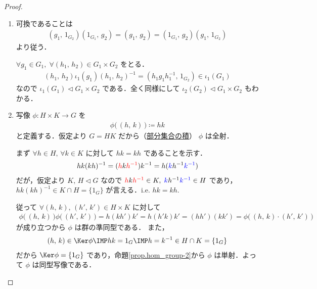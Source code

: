 \documentclass[geometry_main]{subfiles}
\begin{document}
\begin{proof}
	\begin{enumerate}
		\item 
		可換であることは
		\begin{align}
			(g_1,\, 1_{G_2})(1_{G_1},\, g_2) = (g_1,\, g_2) = (1_{G_1},\, g_2)(g_1,\, 1_{G_2})
		\end{align}
		より従う．

		$\forall g_1 \in G_1,\; \forall (h_1,\, h_2) \in G_1 \times G_2$ をとる．
		\begin{align}
			(h_1,\, h_2)\iota_1(g_1) (h_1,\, h_2)^{-1} = (h_1g_1h_1^{-1},\, 1_{G_2}) \in \iota_1(G_1)
		\end{align}
		なので $\iota_1(G_1) \vartriangleleft G_1 \times G_2$ である．全く同様にして $\iota_2(G_2) \vartriangleleft G_1 \times G_2$ もわかる．
		\item 
		写像 $\phi \colon H \times K \to G$ を
		\begin{align}
			\phi\bigl(\,(h,\, k)\, \bigr) \coloneqq hk
		\end{align}
		と定義する．仮定より $G = HK$ だから（\hyperref[def:prod-group-subset]{部分集合の積}） $\phi$ は全射．
	
		まず $\forall h \in H,\,  \forall k \in K$ に対して $hk = kh$ であることを示す．
		\begin{align}
			hk(kh)^{-1} = (\textcolor{red}{ h}k \textcolor{red}{ h^{-1}})k^{-1} = h(\textcolor{blue}{k}h^{-1}\textcolor{blue}{k^{-1}})
		\end{align}
		だが，仮定より $K,\, H \vartriangleleft G$ なので $\textcolor{red}{ h}k \textcolor{red}{ h^{-1}} \in K,\; \textcolor{blue}{k}h^{-1}\textcolor{blue}{k^{-1}} \in H$ であり，$hk(kh)^{-1} \in K \cap H = \{1_G\}$ が言える．i.e. $hk = kh.$
		
		従って $\forall (h,\, k),\, (h',\, k') \in H\times K$ に対して
		\begin{align}
			\phi\bigl(\,(h,\, k)\,\bigr)\phi\bigl(\,(h',\, k')\,\bigr) = h(kh')k' = h(h'k)k' = (hh')(kk') = \phi\bigl(\, (h,\, k) \cdot (h',\, k')\,\bigr)
		\end{align}
		が成り立つから $\phi$ は群の準同型である．
		また，
		\begin{align}
			(h,\, k) \in \Ker \phi \IMP hk = 1_G \IMP h = k^{-1} \in H \cap K = \{1_G\}
		\end{align}
		だから $\Ker \phi = \{1_G\}$ であり，命題\ref{prop.hom_group-2}から $\phi$ は単射．よって $\phi$ は同型写像である．
	\end{enumerate}
\end{proof}
\end{document}
